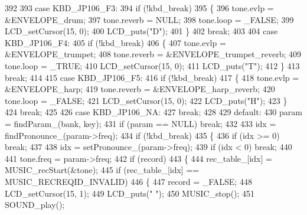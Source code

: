 \begin{DoxyCode}
{392 
393         \textcolor{keywordflow}{case} KBD\_JP106\_F3:
394             \textcolor{keywordflow}{if} (!kbd\_break)
395             \{
396                 tone.evlp = &ENVELOPE\_drum;
397                 tone.reverb = NULL;
398                 tone.loop = \_FALSE;
399                 LCD\_setCursor(15, 0);
400                 LCD\_puts(\textcolor{stringliteral}{"D"});
401             \}
402             \textcolor{keywordflow}{break};
403 
404         \textcolor{keywordflow}{case} KBD\_JP106\_F4:
405             \textcolor{keywordflow}{if} (!kbd\_break)
406             \{
407                 tone.evlp = &ENVELOPE\_trumpet;
408                 tone.reverb = &ENVELOPE\_trumpet\_reverb;
409                 tone.loop = \_TRUE;
410                 LCD\_setCursor(15, 0);
411                 LCD\_puts(\textcolor{stringliteral}{"T"});
412             \}
413             \textcolor{keywordflow}{break};
414 
415         \textcolor{keywordflow}{case} KBD\_JP106\_F5:
416             \textcolor{keywordflow}{if} (!kbd\_break)
417             \{
418                 tone.evlp = &ENVELOPE\_harp;
419                 tone.reverb = &ENVELOPE\_harp\_reverb;
420                 tone.loop = \_FALSE;
421                 LCD\_setCursor(15, 0);
422                 LCD\_puts(\textcolor{stringliteral}{"H"});
423             \}
424             \textcolor{keywordflow}{break};
425 
426         \textcolor{keywordflow}{case} KBD\_JP106\_NA:
427             \textcolor{keywordflow}{break};
428 
429         \textcolor{keywordflow}{default}:
430             param = findParam\_(bank, key);
431             \textcolor{keywordflow}{if} (param == NULL) \textcolor{keywordflow}{break};
432 
433             idx = findPronounce\_(param->freq);
434             \textcolor{keywordflow}{if} (!kbd\_break)
435             \{
436                 \textcolor{keywordflow}{if} (idx >= 0) \textcolor{keywordflow}{break};
437 
438                 idx = setPronounce\_(param->freq);
439                 \textcolor{keywordflow}{if} (idx < 0) \textcolor{keywordflow}{break};
440 
441                 tone.freq = param->freq;
442                 \textcolor{keywordflow}{if} (record)
443                 \{
444                     rec\_table\_[idx] = MUSIC\_recStart(&tone);
445                     \textcolor{keywordflow}{if} (rec\_table\_[idx] == MUSIC\_RECREQID\_INVALID)
446                     \{
447                         record = \_FALSE;
448                         LCD\_setCursor(15, 1);
449                         LCD\_puts(\textcolor{stringliteral}{" "});
450                         MUSIC\_stop();
451                         SOUND\_play();
}
\end{DoxyCode}
